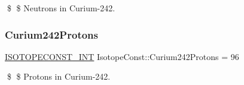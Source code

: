 \$ \$ Neutrons in Curium-\/242. \mbox{\label{group___isotope_const-_curium-_cm242_ga26c1cea8cb4c7073484d7bafb99b7c2c}} 
\subsubsection{\texorpdfstring{Curium242\+Protons}{Curium242Protons}}
{\footnotesize\ttfamily \mbox{\hyperlink{group___isotope_const-_macros_ga5f18360b3e99483a35c32d789e62621c}{I\+S\+O\+T\+O\+P\+E\+C\+O\+N\+S\+T\+\_\+\+I\+NT}} Isotope\+Const\+::\+Curium242\+Protons = 96}

\$ \$ Protons in Curium-\/242. 